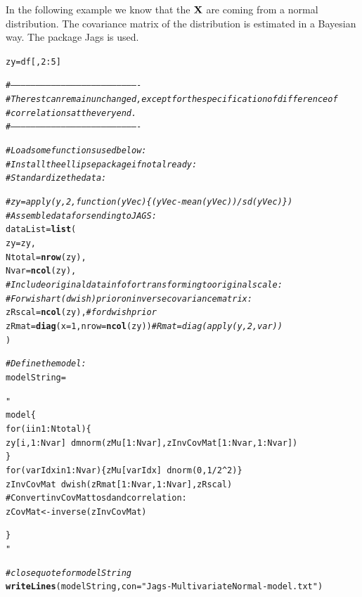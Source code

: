 \documentclass[11pt,a4paper,twoside]{book}
\makeatletter
\newcommand{\hlnum}[1]{\textcolor[rgb]{0.686,0.059,0.569}{#1}}%
\newcommand{\hlstr}[1]{\textcolor[rgb]{0.192,0.494,0.8}{#1}}%
\newcommand{\hlcom}[1]{\textcolor[rgb]{0.678,0.584,0.686}{\textit{#1}}}%
\newcommand{\hlopt}[1]{\textcolor[rgb]{0,0,0}{#1}}%
\newcommand{\hlstd}[1]{\textcolor[rgb]{0.345,0.345,0.345}{#1}}%
\newcommand{\hlkwb}[1]{\textcolor[rgb]{0.69,0.353,0.396}{#1}}%
\newcommand{\hlkwc}[1]{\textcolor[rgb]{0.333,0.667,0.333}{#1}}%
\newcommand{\hlkwd}[1]{\textcolor[rgb]{0.737,0.353,0.396}{\textbf{#1}}}%
\newenvironment{kframe}{%
 \def\at@end@of@kframe{}%
 \ifinner\ifhmode%
  \def\at@end@of@kframe{\end{minipage}}%
  \begin{minipage}{\columnwidth}%
 \fi\fi%
 \def\FrameCommand##1{\hskip\@totalleftmargin \hskip-\fboxsep
 \colorbox{shadecolor}{##1}\hskip-\fboxsep
     \hskip-\linewidth \hskip-\@totalleftmargin \hskip\columnwidth}%
 \MakeFramed {\advance\hsize-\width
   \@totalleftmargin\z@ \linewidth\hsize
   \@setminipage}}%
 {\par\unskip\endMakeFramed%
 \at@end@of@kframe}
\newenvironment{knitrout}{}{} %
\makeatother
\begin{document}
In the following example we know that the ${\mathbf{X}}$ are coming from a normal distribution. The covariance matrix of the distribution is estimated in a Bayesian way. The package Jags is used.

\begin{knitrout}
\color{fgcolor}\begin{kframe}
\begin{alltt}
\hlstd{zy} \hlkwb{=} \hlstd{df[,}\hlnum{2}\hlopt{:}\hlnum{5}\hlstd{]}

\hlcom{#----------------------------------------------------------------------------}
\hlcom{# The rest can remain unchanged, except for the specification of difference of}
\hlcom{# correlations at the very end.}
\hlcom{#----------------------------------------------------------------------------}

\hlcom{# Load some functions used below:}
\hlcom{# Install the ellipse package if not already:}
\hlcom{# Standardize the data:}

\hlcom{#zy = apply(y,2,function(yVec)\{(yVec-mean(yVec))/sd(yVec)\})}
\hlcom{# Assemble data for sending to JAGS:}
\hlstd{dataList} \hlkwb{=} \hlkwd{list}\hlstd{(}
        \hlkwc{zy} \hlstd{= zy ,}
        \hlkwc{Ntotal} \hlstd{=}  \hlkwd{nrow}\hlstd{(zy) ,}
        \hlkwc{Nvar} \hlstd{=} \hlkwd{ncol}\hlstd{(zy) ,}
        \hlcom{# Include original data info for transforming to original scale:}
        \hlcom{# For wishart (dwish) prior on inverse covariance matrix:}
        \hlkwc{zRscal} \hlstd{=} \hlkwd{ncol}\hlstd{(zy) ,}  \hlcom{# for dwish prior}
        \hlkwc{zRmat} \hlstd{=} \hlkwd{diag}\hlstd{(}\hlkwc{x}\hlstd{=}\hlnum{1}\hlstd{,}\hlkwc{nrow}\hlstd{=}\hlkwd{ncol}\hlstd{(zy))}  \hlcom{# Rmat = diag(apply(y,2,var))}
\hlstd{)}

\hlcom{# Define the model:}
\hlstd{modelString} \hlkwb{=} \hlstr{"
model \{
for ( i in 1:Ntotal ) \{
zy[i,1:Nvar] ~ dmnorm( zMu[1:Nvar] , zInvCovMat[1:Nvar,1:Nvar] ) 
\}
for ( varIdx in 1:Nvar ) \{ zMu[varIdx] ~ dnorm( 0 , 1/2^2 ) \}
zInvCovMat ~ dwish( zRmat[1:Nvar,1:Nvar] , zRscal )
# Convert invCovMat to sd and correlation:
zCovMat <- inverse( zInvCovMat )

\}
"} \hlcom{# close quote for modelString}
\hlkwd{writeLines}\hlstd{( modelString ,} \hlkwc{con}\hlstd{=}\hlstr{"Jags-MultivariateNormal-model.txt"} \hlstd{)}


\end{alltt}
\end{kframe}
\end{knitrout}
\end{document}
